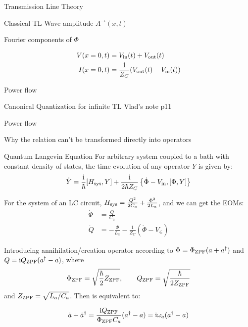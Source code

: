 
\begin{section}{Transmission Line Theory}

\begin{subsection}{Classical TL}
Wave amplitude $A^\rightarrow(x,t)$

Fourier components of $\Phi$ 

\begin{align}
V(x=0,t) &= V_{\mathrm{in}}(t) + V_{\mathrm{out}}(t)\\
I(x=0,t) &= \frac{1}{Z_C}(V_{\mathrm{out}}(t) - V_{\mathrm{in}}(t))
\end{align}


Power flow
\end{subsection}

\begin{subsection}{Canonical Quantization for infinite TL}
Vlad's note p11

Power flow

Why the relation can't be transformed directly into operators
\end{subsection}


\begin{subsection}{Quantum Langevin Equation}
For arbitrary system coupled to a bath with constant density of states, the time evolution of any operator $\hat{Y}$ is given by: 
\begin{equation}
\dot{Y} = \frac{\mathrm{i}}{\hbar} [H_{\mathrm{sys}}, Y] + \frac{\mathrm{i}}{2 \hbar Z_C}\left \{ \dot{\Phi} - V_{\mathrm{in}}, [\Phi, Y] \right \}
\end{equation}

For the system of an LC circuit, $H_{\mathrm{sys}} = \frac{{Q}^2}{2{C_a}} +  \frac{{\Phi}^2}{2{L_a}}$, and we can get the EOMs: 
\begin{align}
\dot{\Phi} &= \frac{Q}{C_a} \label{eq:Phidotdir} \\
\dot{Q} &= -\frac{\Phi}{L_a} - \frac{1}{Z_C}(\dot{\Phi} - V_\in) \label{eq:Qdotdir}
\end{align}

Introducing annihilation/creation operator according to $\Phi = \Phi _{\mathrm{ZPF}} (a + a^\dagger)$ and $Q =\mathrm{i} Q_{\mathrm{ZPF}} (a^\dagger - a)$, where
\[
\Phi_{\mathrm{ZPF}} = \sqrt{\frac{\hbar}{2} Z_{\mathrm{ZPF}}}, \qquad Q_{\mathrm{ZPF}} = \sqrt{\frac{\hbar}{2 Z_{\mathrm{ZPF}}
}}
\]
and $Z_{\mathrm{ZPF}} = \sqrt{L_a/C_a}$. Then  is equivalent to: 

\begin{equation}\label{eq:a1}
\dot{a} + \dot{a}^\dagger = \frac{\mathrm{i} Q_{\mathrm{ZPF}}}{\Phi_{\mathrm{ZPF}} C_a} (a^\dagger- a) = \mathrm{i} \omega_a (a^\dagger - a)
\end{equation}


\end{subsection}
\end{section}
